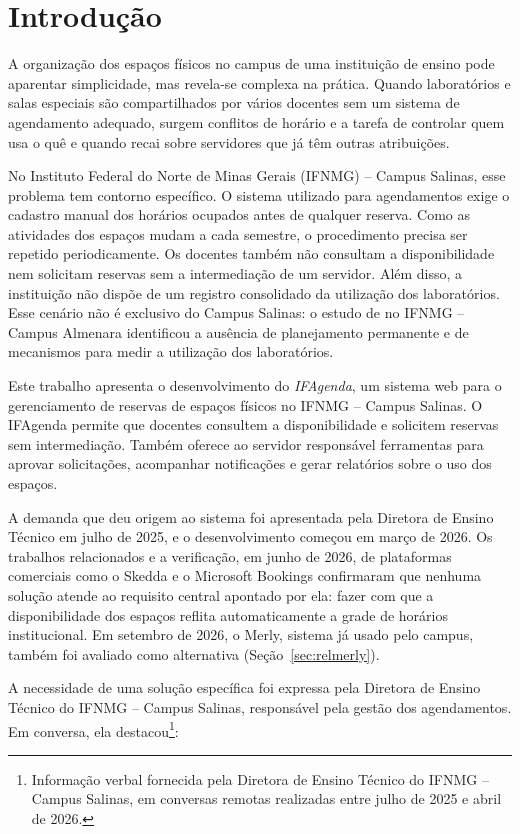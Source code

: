 \chapter{Introdução}
\label{Introducao}
A organização dos espaços físicos no campus de uma instituição de ensino pode aparentar simplicidade, mas revela-se complexa na prática. Quando laboratórios e salas especiais são compartilhados por vários docentes sem um sistema de agendamento adequado, surgem conflitos de horário e a tarefa de controlar quem usa o quê e quando recai sobre servidores que já têm outras atribuições.

No Instituto Federal do Norte de Minas Gerais (IFNMG) -- Campus Salinas, esse problema tem contorno específico. O sistema utilizado para agendamentos exige o cadastro manual dos horários ocupados antes de qualquer reserva. Como as atividades dos espaços mudam a cada semestre, o procedimento precisa ser repetido periodicamente. Os docentes também não consultam a disponibilidade nem solicitam reservas sem a intermediação de um servidor. Além disso, a instituição não dispõe de um registro consolidado da utilização dos laboratórios. Esse cenário não é exclusivo do Campus Salinas: o estudo de  no IFNMG -- Campus Almenara identificou a ausência de planejamento permanente e de mecanismos para medir a utilização dos laboratórios.

Este trabalho apresenta o desenvolvimento do \textit{IFAgenda}, um sistema web para o gerenciamento de reservas de espaços físicos no IFNMG -- Campus Salinas. O IFAgenda permite que docentes consultem a disponibilidade e solicitem reservas sem intermediação. Também oferece ao servidor responsável ferramentas para aprovar solicitações, acompanhar notificações e gerar relatórios sobre o uso dos espaços.

A demanda que deu origem ao sistema foi apresentada pela Diretora de Ensino Técnico em julho de 2025, e o desenvolvimento começou em março de 2026. Os trabalhos relacionados \cite{cruz2023gestao,nascimento2020reservas} e a verificação, em junho de 2026, de plataformas comerciais como o Skedda \cite{skedda2025} e o Microsoft Bookings \cite{microsoft2025bookings} confirmaram que nenhuma solução atende ao requisito central apontado por ela: fazer com que a disponibilidade dos espaços reflita automaticamente a grade de horários institucional. Em setembro de 2026, o Merly, sistema já usado pelo campus, também foi avaliado como alternativa (Seção~\ref{sec:relmerly}).

A necessidade de uma solução específica foi expressa pela Diretora de Ensino Técnico do IFNMG -- Campus Salinas, responsável pela gestão dos agendamentos. Em conversa, ela destacou\footnote{Informação verbal fornecida pela Diretora de Ensino Técnico do IFNMG -- Campus Salinas, em conversas remotas realizadas entre julho de 2025 e abril de 2026.}:

